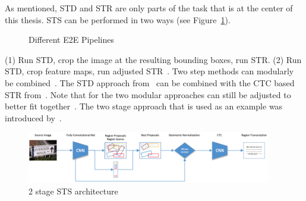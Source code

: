 As mentioned, \ac{STD} and \ac{STR} are only parts of the task that is at the center of this thesis.
\ac{STS} can be performed in two ways (see Figure~\ref{fig:e2e-pipelines}).

\begin{figure}[ht]
    \centering
    
    \caption{Different E2E Pipelines\label{fig:e2e-pipelines}}
\end{figure}
(1) Run \ac{STD}, crop the image at the resulting bounding boxes, run \ac{STR}.
(2) Run \ac{STD}, crop feature maps, run adjusted \ac{STR}~\citep{chen_text_2021,long_scene_2021}.
Two step methods can modularly be combined~\citep{liao_textboxes_2017}.
The \ac{STD} approach from~\cite{liao_textboxes_2017} can be combined with the CTC based \ac{STR}
from~\cite{shi_end--end_2017}.
Note that for the two modular approaches can still be adjusted to better fit
together~\citep{liao_textboxes_2017}.
The two stage approach that is used as an example was introduced by~\cite{busta_deep_2017}.
\begin{figure}[h]
    \centering
    \includegraphics[width=0.95\textwidth]{img/E2E-two-stage-architecture-Bust-Deep-2017.png}
    \caption[2 stage STS architecture]{%
        2 stage STS architecture~\citep{busta_deep_2017}\label{fig:e2e-2-stage}
    }
\end{figure}
